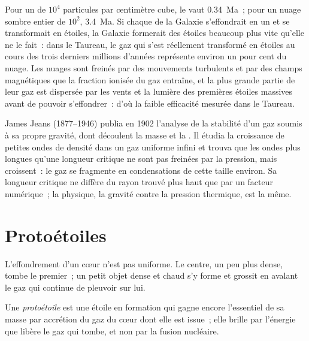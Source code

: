 Pour un  de $10^4$ particules par centimètre cube, le  vaut
\qty{0.34}{Ma}~; pour un nuage sombre entier de $10^2$, \qty{3.4}{Ma}. Si chaque  de la Galaxie s'effondrait en un  et se transformait en étoiles, la
Galaxie formerait des étoiles beaucoup plus vite qu'elle ne le fait~: dans le Taureau, le gaz qui s'est réellement transformé en étoiles au cours des trois derniers millions d'années représente environ un pour cent du nuage. Les nuages sont freinés par des mouvements turbulents
et par des champs magnétiques que la fraction ionisée du gaz entraîne, et la plus grande partie de leur gaz est dispersée par les vents et la lumière des premières étoiles massives avant de pouvoir s'effondrer~: d'où la faible
efficacité
mesurée
dans
le
Taureau.

\begin{history}
James Jeans (1877--1946) publia en 1902 l'analyse de la stabilité d'un gaz soumis à sa
propre gravité, dont découlent la masse et la . Il étudia la croissance de petites ondes de densité dans un gaz uniforme infini et trouva que les ondes
plus longues qu'une longueur critique ne sont pas freinées par la pression, mais croissent~: le gaz se fragmente en condensations de cette taille environ. Sa longueur critique ne diffère du rayon trouvé plus haut que par un facteur numérique~; la physique,
la gravité contre la pression thermique,
est
la
même.
\end{history}

\section{Protoétoiles}

L'effondrement d'un cœur n'est pas uniforme. Le centre, un peu plus dense, tombe
le premier~; un petit objet dense et chaud s'y forme et grossit en avalant le gaz qui continue de pleuvoir sur
lui.

\begin{definition}[Protoétoile]\label{def:b2:ism-star-formation:protostar}
Une \emph{protoétoile} est une étoile en formation qui gagne
encore l'essentiel de sa masse par accrétion du gaz du cœur dont elle est issue~; elle brille par l'énergie que libère le gaz qui tombe, et non par la fusion
nucléaire.
\end{definition}

